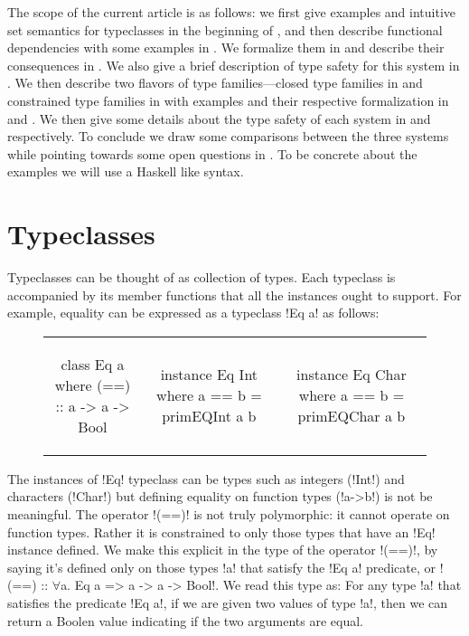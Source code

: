 \documentclass[format=acmsmall,manuscript,review,screen,nonacm,margin=1in,11pt]{acmart}
\begin{document}
The scope of the current article is as follows:
we first give examples and intuitive set semantics for typeclasses in the beginning of ,
and then describe functional dependencies\cite{jones_tcfd_2000} with some examples in .
We formalize them in  and describe their consequences %
in .
We also give a brief description of type safety for this system in .
We then describe two flavors of type families---closed type families\cite{eisenberg_typefamilies_2014}
in  and  constrained type families\cite{morris_typefamilies_2017}
in  with examples and their respective formalization in 
and . We then give some details about the type safety of
each system in  and  respectively.
To conclude we %
draw some comparisons between the three systems while pointing towards some open questions in .
To be concrete about the examples we will use a Haskell like syntax.

\section{Typeclasses}\label{sec:tc}
Typeclasses can be thought of as collection of types. Each typeclass is accompanied by its member
functions that all the instances ought to support. For example,
equality can be expressed as a typeclass !Eq a! as follows:
\begin{figure}[ht]
  \footnotesize
  \begin{tabular}{c c c}
\begin{code}
class Eq a where
  (==) :: a -> a -> Bool
\end{code}&%
\begin{code}
instance Eq Int where
  a == b = primEQInt a b
\end{code}&%
\begin{code}
instance Eq Char where
  a == b = primEQChar a b
\end{code}
  \end{tabular}
\end{figure}

The instances of !Eq! typeclass can be types such as integers (!Int!) and characters (!Char!) but
defining equality on function types (!a->b!) is not be meaningful. The operator
!(==)! is not truly polymorphic: it cannot operate on function types. Rather
it is constrained to only those types that have an !Eq! instance defined.
We make this explicit in the type of the operator !(==)!, by saying it's defined
only on those types !a! that satisfy the !Eq a! predicate,
or !(==) :: $\forall$a. Eq a => a -> a -> Bool!. We read this type as: For any type !a! that
satisfies the predicate !Eq a!, if we are given two
values of type !a!, then we can return a Boolen value indicating if the two arguments are equal.
\end{document}
